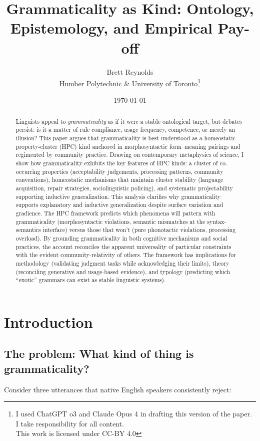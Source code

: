 \documentclass[12pt]{article}
\title{Grammaticality as Kind: Ontology, Epistemology, and Empirical Pay-off}
\author{Brett Reynolds \orcidlink{0000-0003-0073-7195}\\Humber Polytechnic \& University of Toronto\thanks{I used ChatGPT o3 and Claude Opus 4 in drafting this version of the paper. I take responsibility for all content. \\This work is licensed under CC-BY 4.0}}
\date{\today}
\begin{document}
\maketitle

\begin{abstract}
\small
\noindent
Linguists appeal to \textit{grammaticality} as if it were a stable ontological target, but debates persist: is it a matter of rule compliance, usage frequency, competence, or merely an illusion? This paper argues that grammaticality is best understood as a homeostatic property-cluster (HPC) kind anchored in morphosyntactic form–meaning pairings and regimented by community practice. Drawing on contemporary metaphysics of science, I show how grammaticality exhibits the key features of HPC kinds: a cluster of co-occurring properties (acceptability judgements, processing patterns, community conventions), homeostatic mechanisms that maintain cluster stability (language acquisition, repair strategies, sociolinguistic policing), and systematic projectability supporting inductive generalization. This analysis clarifies why grammaticality supports explanatory and inductive generalization despite surface variation and gradience. The HPC framework predicts which phenomena will pattern with grammaticality (morphosyntactic violations, semantic mismatches at the syntax-semantics interface) versus those that won't (pure phonotactic violations, processing overload). By grounding grammaticality in both cognitive mechanisms and social practices, the account reconciles the apparent universality of particular constraints with the evident community-relativity of others. The framework has implications for methodology (validating judgment tasks while acknowledging their limits), theory (reconciling generative and usage-based evidence), and typology (predicting which \enquote{exotic} grammars can exist as stable linguistic systems).
\end{abstract}

\section{Introduction}

\subsection{The problem: What kind of thing is grammaticality?}

Consider three utterances that native English speakers consistently reject:
\end{document}

